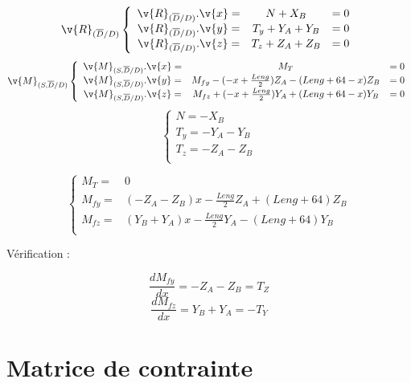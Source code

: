 $$ \v{R}_{(\overline{D}/D)} \left\{
\begin{array}{ccc}
\v{R}_{(\overline{D}/D)} . \v{x} =  & N + X_B &=  0 \\
\v{R}_{(\overline{D}/D)} . \v{y} =  & T_y + Y_A + Y_B & = 0 \\
\v{R}_{(\overline{D}/D)} . \v{z} =  & T_z + Z_A + Z_B & = 0\\
\end{array}
\right.
$$
\newline
$$ \v{M}_{(S,\overline{D}/D)}  \left\{
\begin{array}{ccc}
\v{M}_{(S,\overline{D}/D)} . \v{x} =  & M_T &=  0 \\
\v{M}_{(S,\overline{D}/D)} . \v{y} =  & M_{fy} - (-x+\frac{Leng}{2})  Z_A -(Leng + 64 - x) Z_B & = 0 \\
\v{M}_{(S,\overline{D}/D)} . \v{z} =  & M_{fz} + (-x+\frac{Leng}{2}) Y_A +(Leng + 64 - x)Y_B  &= 0\\
\end{array}
\right.
$$
\newline
$$  \left\{
\begin{array}{ccc}
 N   = - X_B \\
 T_y = - Y_A - Y_B  \\
 T_z = - Z_A - Z_B \\
\end{array}
\right.
$$


$$ \left\{
\begin{array}{ccc}
 M_T =& 0 \\
 M_{fy} =& (-Z_A-Z_B)x -\frac{Leng}{2}Z_A + (Leng +64) Z_B  \\
 M_{fz} =& (Y_B+Y_A)x  -\frac{Leng}{2}Y_A - (Leng + 64)Y_B \\
\end{array}
\right.
$$


\n
Vérification :\n

$$\frac{dM_{fy}}{dx} = -Z_A - Z_B = T_Z $$
$$ \frac{dM_{fz}}{dx} = Y_B+ Y_A = -T_Y$$


\newpage
\section{Matrice de contrainte}

